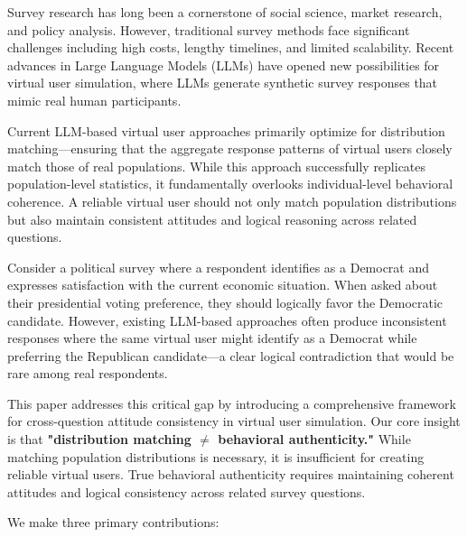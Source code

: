 \documentclass[sigconf, anonymous]{acmart}
\begin{document}
Survey research has long been a cornerstone of social science, market research, and policy analysis. However, traditional survey methods face significant challenges including high costs, lengthy timelines, and limited scalability. Recent advances in Large Language Models (LLMs) have opened new possibilities for virtual user simulation, where LLMs generate synthetic survey responses that mimic real human participants.

Current LLM-based virtual user approaches primarily optimize for distribution matching—ensuring that the aggregate response patterns of virtual users closely match those of real populations. While this approach successfully replicates population-level statistics, it fundamentally overlooks individual-level behavioral coherence. A reliable virtual user should not only match population distributions but also maintain consistent attitudes and logical reasoning across related questions.

Consider a political survey where a respondent identifies as a Democrat and expresses satisfaction with the current economic situation. When asked about their presidential voting preference, they should logically favor the Democratic candidate. However, existing LLM-based approaches often produce inconsistent responses where the same virtual user might identify as a Democrat while preferring the Republican candidate—a clear logical contradiction that would be rare among real respondents.

This paper addresses this critical gap by introducing a comprehensive framework for cross-question attitude consistency in virtual user simulation. Our core insight is that \textbf{"distribution matching $\neq$ behavioral authenticity."} While matching population distributions is necessary, it is insufficient for creating reliable virtual users. True behavioral authenticity requires maintaining coherent attitudes and logical consistency across related survey questions.

We make three primary contributions:
\end{document}
